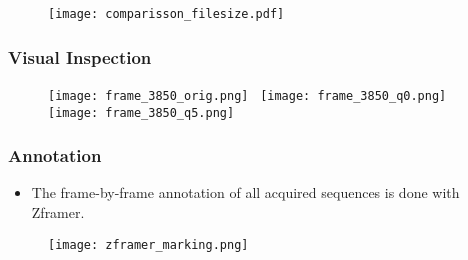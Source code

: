 \documentclass{beamer}
\begin{document}


		 \begin{frame}%
			\begin{figure}
				\texttt{[image: comparisson\_filesize.pdf]}
			 \end{figure}
		 \end{frame}


		 \begin{frame}\frametitle{Visual Inspection}
			\begin{figure}[htb!]
				\centering
				\texttt{[image: frame\_3850\_orig.png]}~
				\texttt{[image: frame\_3850\_q0.png]}\\
				\vspace{.5mm}
				\texttt{[image: frame\_3850\_q5.png]}
				\label{fig:compression_vis}
			\end{figure}
		\end{frame}


		\begin{frame}\frametitle{Annotation}
			\begin{itemize}
				\item The frame-by-frame annotation of all acquired sequences is done with Zframer.
			\end{itemize}
			\begin{figure}[htb]
				\centering
				\texttt{[image: zframer\_marking.png]}
				\label{fig:zframer1}
			\end{figure}
		\end{frame}
\end{document}
